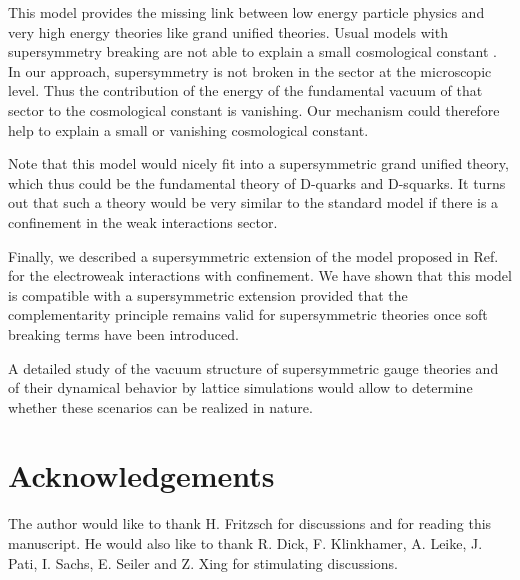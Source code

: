 \documentclass[a4paper,12pt]{article}
\begin{document}
This model provides the missing link between low energy particle
physics and very high energy theories like grand unified theories.
Usual models with supersymmetry breaking are not able to explain a
small cosmological constant \cite{Witten:2000zk}. In our approach,
supersymmetry is not broken in the \coordHE{} sector at the microscopic
level.  Thus the contribution of the energy of the fundamental vacuum
of that sector to the cosmological constant is vanishing. Our
mechanism could therefore help to explain a small or vanishing
cosmological constant.

Note that this model would nicely fit into a supersymmetric \coordHE{}
grand unified theory, which thus could be the fundamental theory of
D-quarks and D-squarks. It turns out that such a theory would be very
similar to the standard model if there is a confinement in the weak
interactions sector.



Finally, we described a supersymmetric extension of the model proposed
in Ref. \cite{CF} for the electroweak interactions with \coordHE{}
confinement. We have shown that this model is compatible with a
supersymmetric extension provided that the complementarity principle
remains valid for supersymmetric theories once soft breaking terms
have been introduced.

A detailed study of the vacuum structure of supersymmetric \coordHE{}
gauge theories and of their dynamical behavior by lattice simulations
would allow to determine whether these scenarios can be realized in
nature.

\section*{Acknowledgements}
The author would like to thank H. Fritzsch for discussions and for
reading this manuscript. He would also like to thank R. Dick, F.
Klinkhamer, A. Leike, J.  Pati, I. Sachs, E. Seiler and Z. Xing for
stimulating discussions.
\end{document}
